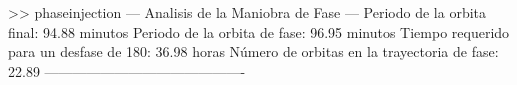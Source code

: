 >> phaseinjection
--- Analisis de la Maniobra de Fase ---
Periodo de la orbita final: 94.88 minutos
Periodo de la orbita de fase: 96.95 minutos
Tiempo requerido para un desfase de 180: 36.98 horas
Número de orbitas en la trayectoria de fase: 22.89
-------------------------------------------